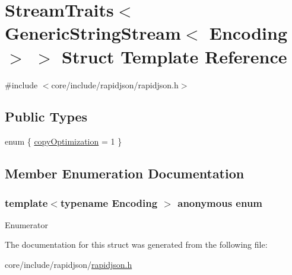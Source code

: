 \hypertarget{structStreamTraits_3_01GenericStringStream_3_01Encoding_01_4_01_4}{}\section{Stream\+Traits$<$ Generic\+String\+Stream$<$ Encoding $>$ $>$ Struct Template Reference}
\label{structStreamTraits_3_01GenericStringStream_3_01Encoding_01_4_01_4}


{\ttfamily \#include $<$core/include/rapidjson/rapidjson.\+h$>$}

\subsection*{Public Types}
\begin{DoxyCompactItemize}
\item 
enum \{ \hyperlink{structStreamTraits_3_01GenericStringStream_3_01Encoding_01_4_01_4_a36081c50934bef71843a4d351a98612eaaeb90f06c2d643f47563c64eb8d4cda7}{copy\+Optimization} = 1
 \}
\end{DoxyCompactItemize}


\subsection{Member Enumeration Documentation}
\subsubsection[{\texorpdfstring{anonymous enum}{anonymous enum}}]{\setlength{\rightskip}{0pt plus 5cm}template$<$typename Encoding $>$ anonymous enum}\hypertarget{structStreamTraits_3_01GenericStringStream_3_01Encoding_01_4_01_4_a36081c50934bef71843a4d351a98612e}{}\label{structStreamTraits_3_01GenericStringStream_3_01Encoding_01_4_01_4_a36081c50934bef71843a4d351a98612e}
\begin{Desc}
\item[Enumerator]\par
\begin{description}
\item[{\em 
copy\+Optimization\hypertarget{structStreamTraits_3_01GenericStringStream_3_01Encoding_01_4_01_4_a36081c50934bef71843a4d351a98612eaaeb90f06c2d643f47563c64eb8d4cda7}{}\label{structStreamTraits_3_01GenericStringStream_3_01Encoding_01_4_01_4_a36081c50934bef71843a4d351a98612eaaeb90f06c2d643f47563c64eb8d4cda7}
}]\end{description}
\end{Desc}


The documentation for this struct was generated from the following file\+:\begin{DoxyCompactItemize}
\item 
core/include/rapidjson/\hyperlink{rapidjson_8h}{rapidjson.\+h}\end{DoxyCompactItemize}
